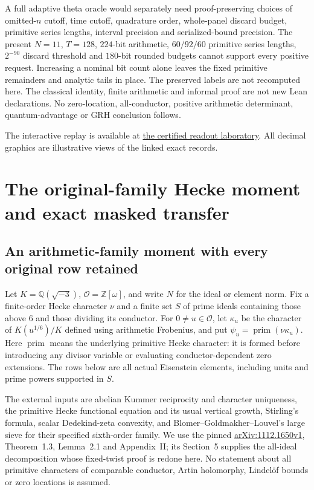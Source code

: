 \documentclass[11pt,oneside,openany]{book}
\theoremstyle{definition}\newtheorem{definition}[theorem]{Definition}
\theoremstyle{remark}\newtheorem{remark}[theorem]{Remark}
\begin{document}
A full adaptive theta oracle would separately need proof-preserving choices
of omitted-$n$ cutoff, time cutoff, quadrature order, whole-panel discard
budget, primitive series lengths, interval precision and serialized-bound
precision. The present $N=11$, $T=128$, $224$-bit arithmetic,
$60/92/60$ primitive series lengths, $2^{-90}$ discard threshold and
$180$-bit rounded budgets cannot support every positive request.
Increasing a nominal bit count alone leaves the fixed primitive remainders
and analytic tails in place. The preserved labels are not recomputed here.
The classical identity, finite arithmetic and informal proof are not new
Lean declarations. No zero-location, all-conductor, positive arithmetic
determinant, quantum-advantage or GRH conclusion follows.

The interactive replay is available at \href{https://amelie-iska.github.io/GRH-research/readout.html}{the certified readout laboratory}. All decimal graphics are illustrative views of the linked exact records.


\chapter{The original-family Hecke moment and exact masked transfer}
\section{An arithmetic-family moment with every original row retained}
\label{mm:core}
Let $K=\mathbb Q(\sqrt{-3})$, $\mathcal O=\mathbb Z[\omega]$, and write
$N$ for the ideal or element norm. Fix a finite-order Hecke character
$\nu$ and a finite set $S$ of prime ideals containing those above $6$ and
those dividing its conductor. For $0\ne u\in\mathcal O$, let $\kappa_u$
be the character of $K(u^{1/6})/K$ defined using arithmetic Frobenius, and
put $\psi_u=\operatorname{prim}(\nu\kappa_u)$. Here
$\operatorname{prim}$ means the underlying primitive Hecke character:
it is formed before introducing any divisor variable or evaluating
conductor-dependent zero extensions. The rows below are all actual
Eisenstein elements, including units and prime powers supported in $S$.

The external inputs are abelian Kummer reciprocity and character
uniqueness, the primitive Hecke functional equation and its usual
vertical growth, Stirling's formula, scalar Dedekind-zeta convexity, and
Blomer--Goldmakher--Louvel's large sieve for their specified sixth-order
family. We use the pinned
\href{https://arxiv.org/pdf/1112.1650v1}{arXiv:1112.1650v1},
Theorem~1.3, Lemma~2.1 and Appendix~II; its Section~5 supplies the
all-ideal decomposition whose fixed-twist proof is redone here.
No statement about all primitive characters of comparable conductor,
Artin holomorphy, Lindel\"of bounds or zero locations is assumed.
\end{document}
